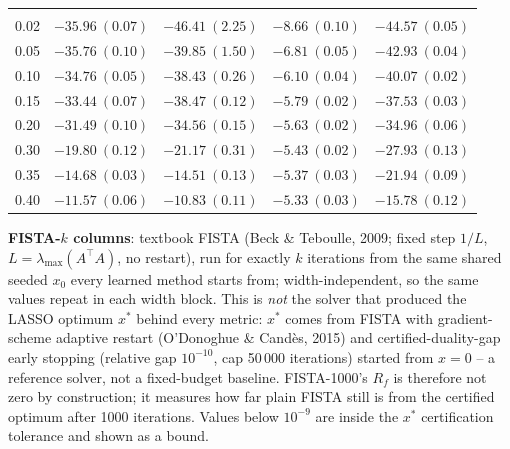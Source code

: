 \begin{table}[htbp]
\begin{tabular}{@{} l rrrr @{}}
\addlinespace
\multicolumn{5}{@{}l}{\textit{Wide ($p \sim \mathcal{U}(0.05, 0.30)$)}} \\
0.02 & $-35.96\ (0.07)$ & $-46.41\ (2.25)$ & $-8.66\ (0.10)$ & $-44.57\ (0.05)$ \\
0.05 & $-35.76\ (0.10)$ & $-39.85\ (1.50)$ & $-6.81\ (0.05)$ & $-42.93\ (0.04)$ \\
0.10 & $-34.76\ (0.05)$ & $-38.43\ (0.26)$ & $-6.10\ (0.04)$ & $-40.07\ (0.02)$ \\
0.15 & $-33.44\ (0.07)$ & $-38.47\ (0.12)$ & $-5.79\ (0.02)$ & $-37.53\ (0.03)$ \\
0.20 & $-31.49\ (0.10)$ & $-34.56\ (0.15)$ & $-5.63\ (0.02)$ & $-34.96\ (0.06)$ \\
0.30 & $-19.80\ (0.12)$ & $-21.17\ (0.31)$ & $-5.43\ (0.02)$ & $-27.93\ (0.13)$ \\
0.35 & $-14.68\ (0.03)$ & $-14.51\ (0.13)$ & $-5.37\ (0.03)$ & $-21.94\ (0.09)$ \\
0.40 & $-11.57\ (0.06)$ & $-10.83\ (0.11)$ & $-5.33\ (0.03)$ & $-15.78\ (0.12)$ \\
\bottomrule
\end{tabular}
\vspace{2pt}
\begin{minipage}{\linewidth}\footnotesize
\textbf{FISTA-$k$ columns}: textbook FISTA (Beck \& Teboulle, 2009; fixed step $1/L$, $L = \lambda_{\max}(A^\top A)$, no restart), run for exactly $k$ iterations from the same shared seeded $x_0$ every learned method starts from; width-independent, so the same values repeat in each width block. This is \emph{not} the solver that produced the LASSO optimum $x^*$ behind every metric: $x^*$ comes from FISTA with gradient-scheme adaptive restart (O'Donoghue \& Cand\`es, 2015) and certified-duality-gap early stopping (relative gap $10^{-10}$, cap 50\,000 iterations) started from $x = 0$ -- a reference solver, not a fixed-budget baseline. FISTA-1000's $R_f$ is therefore not zero by construction; it measures how far plain FISTA still is from the certified optimum after 1000 iterations. Values below $10^{-9}$ are inside the $x^*$ certification tolerance and shown as a bound.
\end{minipage}
\end{table}

